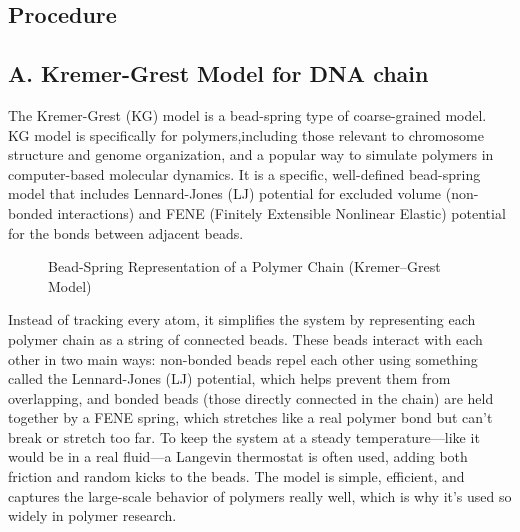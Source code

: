 \documentclass[12pt]{article}
\begin{document}
\begin{flushleft}

\vspace{-1em} 
\section*{Procedure} 
\subsection*{A. Kremer-Grest Model for DNA chain}

	
The Kremer-Grest (KG) model is a bead-spring type of coarse-grained model. KG model is specifically for polymers,including those relevant to chromosome structure and genome organization, and a popular way to simulate polymers in computer-based molecular dynamics. It is a specific, well-defined bead-spring model that includes Lennard-Jones (LJ) potential for excluded volume (non-bonded interactions) and FENE (Finitely Extensible Nonlinear Elastic) potential for the bonds between adjacent beads.	


\begin{figure}[!ht]
  \centering
  \caption{Bead-Spring Representation of a Polymer Chain (Kremer–Grest Model)}
\end{figure}


Instead of tracking every atom, it simplifies the system by representing each polymer chain as a string of connected beads. These beads interact with each other in two main ways: non-bonded beads repel each other using something called the Lennard-Jones (LJ) potential, which helps prevent them from overlapping, and bonded beads (those directly connected in the chain) are held together by a FENE spring, which stretches like a real polymer bond but can't break or stretch too far. To keep the system at a steady temperature—like it would be in a real fluid—a Langevin thermostat is often used, adding both friction and random kicks to the beads. The model is simple, efficient, and captures the large-scale behavior of polymers really well, which is why it's used so widely in polymer research.	




\end{flushleft}
\end{document}
